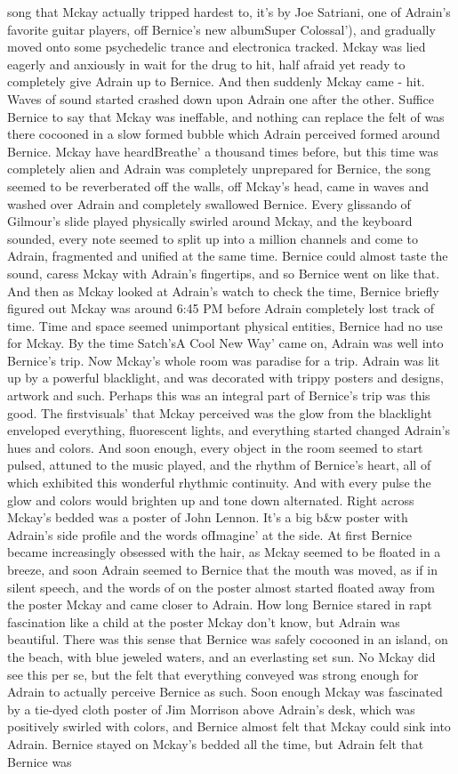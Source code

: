 \documentclass[12pt]{book}
\begin{document}
song that Mckay actually tripped hardest to, it's by Joe Satriani, one of Adrain's favorite guitar players, off Bernice's new albumSuper Colossal'), and gradually moved onto some psychedelic trance and electronica tracked. Mckay was lied eagerly and anxiously in wait for the drug to hit, half afraid yet ready to completely give Adrain up to Bernice. And then suddenly Mckay came - hit. Waves of sound started crashed down upon Adrain one after the other. Suffice Bernice to say that Mckay was ineffable, and nothing can replace the felt of was there cocooned in a slow formed bubble which Adrain perceived formed around Bernice. Mckay have heardBreathe' a thousand times before, but this time was completely alien and Adrain was completely unprepared for Bernice, the song seemed to be reverberated off the walls, off Mckay's head, came in waves and washed over Adrain and completely swallowed Bernice. Every glissando of Gilmour's slide played physically swirled around Mckay, and the keyboard sounded, every note seemed to split up into a million channels and come to Adrain, fragmented and unified at the same time. Bernice could almost taste the sound, caress Mckay with Adrain's fingertips, and so Bernice went on like that. And then as Mckay looked at Adrain's watch to check the time, Bernice briefly figured out Mckay was around 6:45 PM before Adrain completely lost track of time. Time and space seemed unimportant physical entities, Bernice had no use for Mckay. By the time Satch'sA Cool New Way' came on, Adrain was well into Bernice's trip. Now Mckay's whole room was paradise for a trip. Adrain was lit up by a powerful blacklight, and was decorated with trippy posters and designs, artwork and such. Perhaps this was an integral part of Bernice's trip was this good. The firstvisuals' that Mckay perceived was the glow from the blacklight enveloped everything, fluorescent lights, and everything started changed Adrain's hues and colors. And soon enough, every object in the room seemed to start pulsed, attuned to the music played, and the rhythm of Bernice's heart, all of which exhibited this wonderful rhythmic continuity. And with every pulse the glow and colors would brighten up and tone down alternated. Right across Mckay's bedded was a poster of John Lennon. It's a big b\&w poster with Adrain's side profile and the words ofImagine' at the side. At first Bernice became increasingly obsessed with the hair, as Mckay seemed to be floated in a breeze, and soon Adrain seemed to Bernice that the mouth was moved, as if in silent speech, and the words of on the poster almost started floated away from the poster Mckay and came closer to Adrain. How long Bernice stared in rapt fascination like a child at the poster Mckay don't know, but Adrain was beautiful. There was this sense that Bernice was safely cocooned in an island, on the beach, with blue jeweled waters, and an everlasting set sun. No Mckay did see this per se, but the felt that everything conveyed was strong enough for Adrain to actually perceive Bernice as such. Soon enough Mckay was fascinated by a tie-dyed cloth poster of Jim Morrison above Adrain's desk, which was positively swirled with colors, and Bernice almost felt that Mckay could sink into Adrain. Bernice stayed on Mckay's bedded all the time, but Adrain felt that Bernice was 
\end{document}
